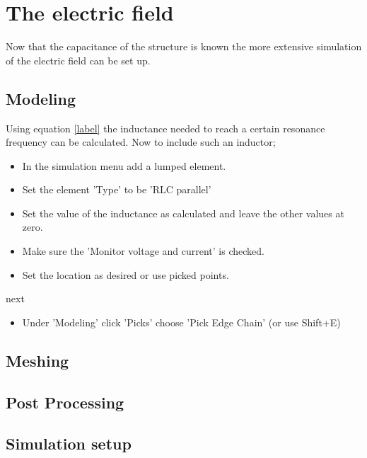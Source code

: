 \section{The electric field}
Now that the capacitance of the structure is known the more extensive simulation of the electric field can be set up.
\subsection{Modeling}
Using equation \eqref{label} the inductance needed to reach a certain resonance frequency can be calculated. Now to include such an inductor;
\begin{itemize}
	\item In the simulation menu add a lumped element.
	\item Set the element 'Type' to be 'RLC parallel'
	\item Set the value of the inductance as calculated and leave the other values at zero.
	\item Make sure the 'Monitor voltage and current' is checked.
	\item Set the location as desired or use picked points.
\end{itemize}

next
\begin{itemize}
	\item Under 'Modeling' click 'Picks' choose 'Pick Edge Chain' (or use Shift+E)
\end{itemize}

\subsection{Meshing}
\subsection{Post Processing}
\subsection{Simulation setup}
